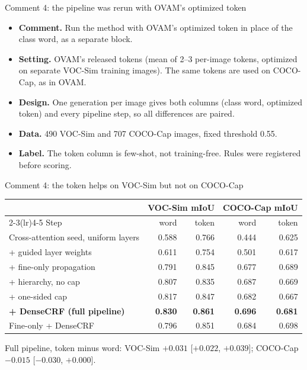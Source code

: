 
\begin{frame}{Comment 4: the pipeline was rerun with OVAM's optimized token}
\begin{itemize}
  \item \textbf{Comment.} Run the method with OVAM's optimized token in place of the class word, as a separate block.
  \item \textbf{Setting.} OVAM's released tokens (mean of 2--3 per-image tokens, optimized on separate VOC-Sim training images). The same tokens are used on COCO-Cap, as in OVAM.
  \item \textbf{Design.} One generation per image gives both columns (class word, optimized token) and every pipeline step, so all differences are paired.
  \item \textbf{Data.} 490 VOC-Sim and 707 COCO-Cap images, fixed threshold 0.55.
  \item \textbf{Label.} The token column is few-shot, not training-free. Rules were registered before scoring.
\end{itemize}
\end{frame}

\begin{frame}{Comment 4: the token helps on VOC-Sim but not on COCO-Cap}
\begin{slidetable}
\begin{tabular}{lrrrr}
\toprule
 & \multicolumn{2}{c}{VOC-Sim mIoU} & \multicolumn{2}{c}{COCO-Cap mIoU} \\
\cmidrule(lr){2-3}\cmidrule(lr){4-5}
Step & word & token & word & token \\
\midrule
Cross-attention seed, uniform layers & 0.588 & 0.766 & 0.444 & 0.625 \\
+ guided layer weights               & 0.611 & 0.754 & 0.501 & 0.617 \\
+ fine-only propagation              & 0.791 & 0.845 & 0.677 & 0.689 \\
+ hierarchy, no cap                  & 0.807 & 0.835 & 0.687 & 0.669 \\
+ one-sided cap                      & 0.817 & 0.847 & 0.682 & 0.667 \\
\textbf{+ DenseCRF (full pipeline)}  & \textbf{0.830} & \textbf{0.861} & \textbf{0.696} & \textbf{0.681} \\
\midrule
Fine-only + DenseCRF                 & 0.796 & 0.851 & 0.684 & 0.698 \\
\bottomrule
\end{tabular}
\end{slidetable}
Full pipeline, token minus word: VOC-Sim $+0.031$ [$+0.022$, $+0.039$]; COCO-Cap $-0.015$ [$-0.030$, $+0.000$].
\end{frame}

